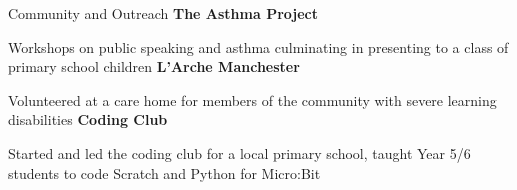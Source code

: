 \begin{rubric}{Community and Outreach}
\entry*[2024 - 2025]%
	\textbf{The Asthma Project}\par
	Workshops on public speaking and asthma culminating in presenting to a class of primary school children
%
\entry*[2022 - 2023]%
	\textbf{L’Arche Manchester}\par
	Volunteered at a care home for members of the community with severe learning disabilities
%
\entry*[2022 - 2023]%
	\textbf{Coding Club}\par
	Started and led the coding club for a local primary school, taught Year 5/6 students to code Scratch and Python for Micro:Bit
%
\end{rubric}